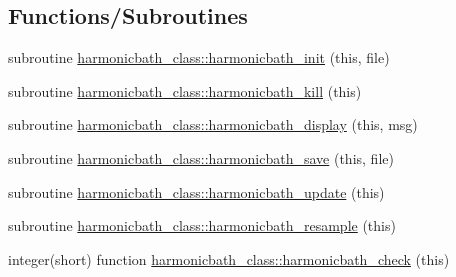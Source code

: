 \subsection*{Functions/\+Subroutines}
\begin{DoxyCompactItemize}
\item 
subroutine \hyperlink{namespaceharmonicbath__class_a7d869bb99a49aa520fe606e808d5feb5}{harmonicbath\+\_\+class\+::harmonicbath\+\_\+init} (this, file)
\item 
subroutine \hyperlink{namespaceharmonicbath__class_ae4e0e1b027594bb77034f21e82f6ed63}{harmonicbath\+\_\+class\+::harmonicbath\+\_\+kill} (this)
\item 
subroutine \hyperlink{namespaceharmonicbath__class_af4ce5a2a61231e5612ff243262e9f993}{harmonicbath\+\_\+class\+::harmonicbath\+\_\+display} (this, msg)
\item 
subroutine \hyperlink{namespaceharmonicbath__class_a9dfb6e87e69957fcc4ec907135931ace}{harmonicbath\+\_\+class\+::harmonicbath\+\_\+save} (this, file)
\item 
subroutine \hyperlink{namespaceharmonicbath__class_ac930ca08461d767f4593374465c7229d}{harmonicbath\+\_\+class\+::harmonicbath\+\_\+update} (this)
\item 
subroutine \hyperlink{namespaceharmonicbath__class_a6b27afcc7c1f24fec82adf3177d0adb8}{harmonicbath\+\_\+class\+::harmonicbath\+\_\+resample} (this)
\item 
integer(short) function \hyperlink{namespaceharmonicbath__class_abde7a862edc5c843e0665c6a6705bd74}{harmonicbath\+\_\+class\+::harmonicbath\+\_\+check} (this)
\end{DoxyCompactItemize}

